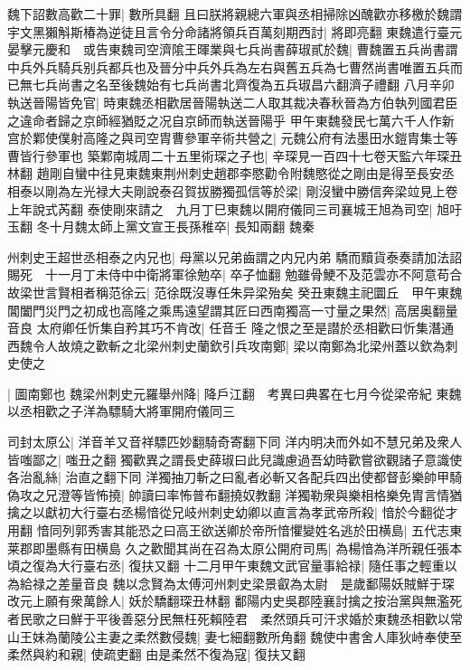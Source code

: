 魏下詔數高歡二十罪|{
	數所具翻}
且曰朕將親總六軍與丞相掃除凶醜歡亦移檄於魏謂宇文黑獺斛斯椿為逆徒且言令分命諸將領兵百萬刻期西討|{
	將即亮翻}
東魏遣行臺元晏擊元慶和　或告東魏司空濟隂王暉業與七兵尚書薛琡貳於魏|{
	曹魏置五兵尚書謂中兵外兵騎兵别兵都兵也及晉分中兵外兵為左右與舊五兵為七曹然尚書唯置五兵而已無七兵尚書之名至後魏始有七兵尚書北齊復為五兵琡昌六翻濟子禮翻}
八月辛卯執送晉陽皆免官|{
	時東魏丞相歡居晉陽執送二人取其裁决春秋晉為方伯執列國君臣之違命者歸之京師經猶貶之况自京師而執送晉陽乎}
甲午東魏發民七萬六千人作新宫於鄴使僕射高隆之與司空胄曹參軍辛術共營之|{
	元魏公府有法墨田水鎧胄集士等曹皆行參軍也}
築鄴南城周二十五里術琛之子也|{
	辛琛見一百四十七卷天監六年琛丑林翻}
趙剛自蠻中往見東魏東荆州刺史趙郡李愍勸令附魏愍從之剛由是得至長安丞相泰以剛為左光禄大夫剛說泰召賀拔勝獨孤信等於梁|{
	剛沒蠻中勝信奔梁竝見上卷上年說式芮翻}
泰使剛來請之　九月丁巳東魏以開府儀同三司襄城王旭為司空|{
	旭吁玉翻}
冬十月魏太師上黨文宣王長孫稚卒|{
	長知兩翻}
魏秦

州刺史王超世丞相泰之内兄也|{
	母黨以兄弟齒謂之内兄内弟}
驕而黷貨泰奏請加法詔賜死　十一月丁未侍中中衛將軍徐勉卒|{
	卒子恤翻}
勉雖骨鯁不及范雲亦不阿意苟合故梁世言賢相者稱范徐云|{
	范徐既沒專任朱异梁殆矣}
癸丑東魏主祀圜丘　甲午東魏閶闔門災門之初成也高隆之乘馬遠望謂其匠曰西南獨高一寸量之果然|{
	高居奥翻量音良}
太府卿任忻集自矜其巧不肯改|{
	任音壬}
隆之恨之至是譛於丞相歡曰忻集潛通西魏令人故燒之歡斬之北梁州刺史蘭欽引兵攻南鄭|{
	梁以南鄭為北梁州蓋以欽為刺史使之}


|{
	圖南鄭也}
魏梁州刺史元羅舉州降|{
	降戶江翻　考異曰典畧在七月今從梁帝紀}
東魏以丞相歡之子洋為驃騎大將軍開府儀同三

司封太原公|{
	洋音羊又音祥驃匹妙翻騎奇寄翻下同}
洋内明决而外如不慧兄弟及衆人皆嗤鄙之|{
	嗤丑之翻}
獨歡異之謂長史薛琡曰此兒識慮過吾幼時歡嘗欲觀諸子意識使各治亂絲|{
	治直之翻下同}
洋獨抽刀斬之曰亂者必斬又各配兵四出使都督彭樂帥甲騎偽攻之兄澄等皆怖撓|{
	帥讀曰率怖普布翻撓奴教翻}
洋獨勒衆與樂相格樂免胄言情猶擒之以獻初大行臺右丞楊愔從兄岐州刺史幼卿以直言為孝武帝所殺|{
	愔於今翻從才用翻}
愔同列郭秀害其能恐之曰高王欲送卿於帝所愔懼變姓名逃於田横島|{
	五代志東莱郡即墨縣有田横島}
久之歡聞其尚在召為太原公開府司馬|{
	為楊愔為洋所親任張本}
頃之復為大行臺右丞|{
	復扶又翻}
十二月甲午東魏文武官量事給禄|{
	隨任事之輕重以為給禄之差量音良}
魏以念賢為太傅河州刺史梁景叡為太尉　是歲鄱陽妖賊鮮于琛改元上願有衆萬餘人|{
	妖於驕翻琛丑林翻}
鄱陽内史吳郡陸襄討擒之按治黨與無濫死者民歌之曰鮮于平後善惡分民無枉死賴陸君　柔然頭兵可汗求婚於東魏丞相歡以常山王妹為蘭陵公主妻之柔然數侵魏|{
	妻七細翻數所角翻}
魏使中書舍人庫狄峙奉使至柔然與約和親|{
	使疏吏翻}
由是柔然不復為寇|{
	復扶又翻}


